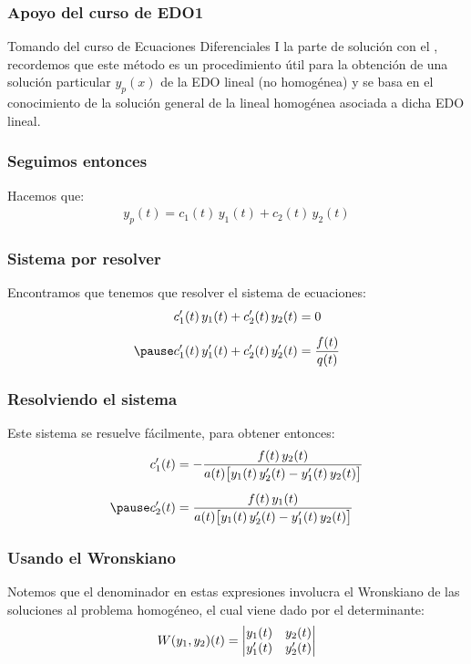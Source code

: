 \documentclass[12pt]{beamer}
\begin{document}
\begin{frame}
\frametitle{Apoyo del curso de EDO1}
Tomando del curso de Ecuaciones Diferenciales I la parte de solución con el , \pause recordemos que este método es un procedimiento útil para la obtención de una solución particular $y_{p} (x)$ de la EDO lineal (no homogénea) \pause y se basa en el conocimiento de la solución general de la lineal homogénea asociada a dicha EDO lineal.
\end{frame}
\begin{frame}
\frametitle{Seguimos entonces}
Hacemos que:
\pause
\begin{align}
y_{p} (t) = c_{1} (t) \, y_{1} (t) + c_{2} (t) \, y_{2} (t)
\label{eq:ecuacion_07_05}
\end{align}
\end{frame}
\begin{frame}
\frametitle{Sistema por resolver}
Encontramos que tenemos que resolver el sistema de ecuaciones:
\pause
\begin{eqnarray}
\begin{aligned}[b]
\pderivada{c}_{1} (t) \, y_{1} (t) + \pderivada{c}_{2} (t) \, y_{2} (t) &= 0 \\[0.5em] \pause
\pderivada{c}_{1} (t) \, \pderivada{y}_{1} (t) + \pderivada{c}_{2} (t) \, \pderivada{y}_{2} (t) &= \dfrac{f (t)}{q (t)}
\end{aligned}
\label{eq:ecuacion_07_06}
\end{eqnarray}
\end{frame}
\begin{frame}
\frametitle{Resolviendo el sistema}
Este sistema se resuelve fácilmente, para obtener entonces:
\pause
\begin{eqnarray}
\begin{aligned}[b]
\pderivada{c}_{1} (t) &= - \dfrac{f (t) \, y_{2} (t)}{a (t) \big[ y_{1} (t) \, \pderivada{y}_{2} (t)  - \pderivada{y}_{1} (t) \, y_{2} (t) \big]} \\[0.5em] \pause
\pderivada{c}_{2} (t) &= \dfrac{f (t) \, y_{1} (t)}{a (t) \big[ y_{1} (t) \, \pderivada{y}_{2} (t)  - \pderivada{y}_{1} (t) \, y_{2} (t) \big]}
\end{aligned}
\label{eq:ecuacion_07_07}
\end{eqnarray}
\end{frame}
\begin{frame}
\frametitle{Usando el Wronskiano}
Notemos que el denominador en estas expresiones involucra el Wronskiano de las soluciones al problema homogéneo, el cual viene dado por el determinante:
\pause
\begin{align*}
W (y_{1}, y_{2}) (t) = \mqty|
y_{1} (t) & y_{2} (t) \\
\pderivada{y}_{1} (t) & \pderivada{y}_{2} (t) |
\end{align*}
\end{frame}
\end{document}

